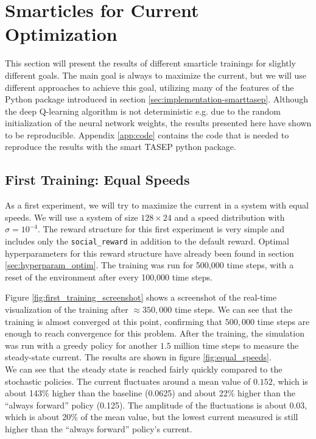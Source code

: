 \section{Smarticles for Current Optimization}
\label{sec:smarticle_current_optimization}
This section will present the results of different smarticle trainings for slightly different goals. The main goal is always to maximize the current, but we will use different approaches to achieve this goal, utilizing many of the features of the Python package introduced in section \ref{sec:implementation-smarttasep}. Although the deep Q-learning algorithm is not deterministic e.g. due to the random initialization of the neural network weights, the results presented here have shown to be reproducible. Appendix \ref{app:code} contains the code that is needed to reproduce the results with the smart TASEP python package.

\subsection{First Training: Equal Speeds}
As a first experiment, we will try to maximize the current in a system with equal speeds. We will use a system of size $128 \times 24$ and a speed distribution with $\sigma=10^{-4}$. The reward structure for this first experiment is very simple and includes only the \texttt{social\_reward} in addition to the default reward. Optimal hyperparameters for this reward structure have already been found in section \ref{sec:hyperparam_optim}. The training was run for 500,000 time steps, with a reset of the environment after every 100,000 time steps.


Figure \ref{fig:first_training_screenshot} shows a screenshot of the real-time visualization of the training after $\approx 350,000$ time steps. We can see that the training is almost converged at this point, confirming that $500,000$ time steps are enough to reach convergence for this problem. After the training, the simulation was run with a greedy policy for another $1.5$ million time steps to measure the steady-state current. The results are shown in figure \ref{fig:equal_speeds}. 
\\
We can see that the steady state is reached fairly quickly compared to the stochastic policies. The current fluctuates around a mean value of $0.152$, which is about 143\% higher than the baseline (0.0625) and about 22\% higher than the \enquote{always forward} policy (0.125). The amplitude of the fluctuations is about $0.03$, which is about 20\% of the mean value, but the lowest current measured is still higher than the \enquote{always forward} policy's current. 


